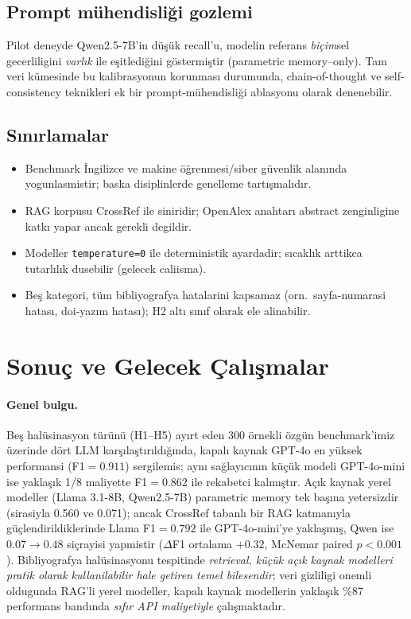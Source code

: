 \documentclass[11pt,a4paper]{article}
\begin{document}
\subsection{Prompt mühendisliği gozlemi}
Pilot deneyde Qwen2.5-7B'in düşük recall'u, modelin referans
\emph{biçim}sel gecerliligini \emph{varlık} ile eşitlediğini göstermiştir
(parametric memory--only). Tam veri kümesinde bu kalibrasyonun korunması
durumunda, chain-of-thought \cite{wei2022cot} ve self-consistency
\cite{wang2023selfconsistency} teknikleri ek bir prompt-mühendisliği
ablasyonu olarak denenebilir.

\subsection{Sınırlamalar}
\begin{itemize}[nosep]
\item Benchmark İngilizce ve makine öğrenmesi/siber güvenlik alanında
yogunlasmistir; baska disiplinlerde genelleme tartışmalıdır.
\item RAG korpusu CrossRef ile siniridir; OpenAlex anahtarı abstract
zenginligine katkı yapar ancak gerekli degildir.
\item Modeller \texttt{temperature=0} ile deterministik ayardadir; sıcaklık
arttikca tutarlılık dusebilir (gelecek caliisma).
\item Beş kategori, tüm bibliyografya hatalarini kapsamaz (orn.\
sayfa-numarasi hatası, doi-yazım hatası); H2 altı sınıf olarak ele alinabilir.
\end{itemize}

\section{Sonuç ve Gelecek Çalışmalar}
\label{sec:gelecek}

\paragraph{Genel bulgu.}
Beş halüsinasyon türünü (H1--H5) ayırt eden 300 örnekli özgün benchmark'imiz
üzerinde dört LLM karşılaştırıldığında, kapalı kaynak GPT-4o en yüksek
performansi (F1$=0.911$) sergilemis; aynı sağlayıcının küçük modeli
GPT-4o-mini ise yaklaşık 1/8 maliyette F1$=0.862$ ile rekabetci kalmıştır.
Açık kaynak yerel modeller (Llama 3.1-8B, Qwen2.5-7B) parametric memory
tek başına yetersizdir (sirasiyla 0.560 ve 0.071); ancak CrossRef tabanlı
bir RAG katmanıyla güçlendirildiklerinde Llama F1$=0.792$ ile GPT-4o-mini'ye
yaklaşmış, Qwen ise $0.07 \to 0.48$ siçrayisi yapmistir ($\Delta$F1
ortalama $+0.32$, McNemar paired $p<0.001$). Bibliyografya halüsinasyonu
tespitinde \emph{retrieval, küçük açık kaynak modelleri pratik olarak
kullanilabilir hale getiren temel bilesendir}; veri gizliligi onemli
oldugunda RAG'li yerel modeller, kapalı kaynak modellerin yaklaşık \%87
performans bandında \emph{sıfır API maliyetiyle} çalışmaktadır.
\end{document}
